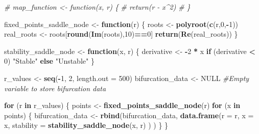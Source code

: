 \documentclass[
]{article}
\newenvironment{Shaded}{\begin{snugshade}}{\end{snugshade}}
\newcommand{\AttributeTok}[1]{\textcolor[rgb]{0.13,0.29,0.53}{#1}}
\newcommand{\CommentTok}[1]{\textcolor[rgb]{0.56,0.35,0.01}{\textit{#1}}}
\newcommand{\ConstantTok}[1]{\textcolor[rgb]{0.56,0.35,0.01}{#1}}
\newcommand{\ControlFlowTok}[1]{\textcolor[rgb]{0.13,0.29,0.53}{\textbf{#1}}}
\newcommand{\DecValTok}[1]{\textcolor[rgb]{0.00,0.00,0.81}{#1}}
\newcommand{\FunctionTok}[1]{\textcolor[rgb]{0.13,0.29,0.53}{\textbf{#1}}}
\newcommand{\NormalTok}[1]{#1}
\newcommand{\OtherTok}[1]{\textcolor[rgb]{0.56,0.35,0.01}{#1}}
\newcommand{\SpecialCharTok}[1]{\textcolor[rgb]{0.81,0.36,0.00}{\textbf{#1}}}
\newcommand{\StringTok}[1]{\textcolor[rgb]{0.31,0.60,0.02}{#1}}
\begin{document}
\begin{Shaded}
\begin{Highlighting}[]
\CommentTok{\# map\_function \textless{}{-} function(x, r) \{}
\CommentTok{\#   return(r {-} x\^{}2)}
\CommentTok{\# \}}

\NormalTok{fixed\_points\_saddle\_node }\OtherTok{\textless{}{-}} \ControlFlowTok{function}\NormalTok{(r) \{}
\NormalTok{  roots }\OtherTok{\textless{}{-}} \FunctionTok{polyroot}\NormalTok{(}\FunctionTok{c}\NormalTok{(r,}\DecValTok{0}\NormalTok{,}\SpecialCharTok{{-}}\DecValTok{1}\NormalTok{))}
\NormalTok{  real\_roots }\OtherTok{\textless{}{-}}\NormalTok{ roots[}\FunctionTok{round}\NormalTok{(}\FunctionTok{Im}\NormalTok{(roots),}\DecValTok{10}\NormalTok{)}\SpecialCharTok{==}\DecValTok{0}\NormalTok{]}
  \FunctionTok{return}\NormalTok{(}\FunctionTok{Re}\NormalTok{(real\_roots))}
\NormalTok{\}}

\NormalTok{stability\_saddle\_node }\OtherTok{\textless{}{-}} \ControlFlowTok{function}\NormalTok{(x, r) \{}
\NormalTok{  derivative }\OtherTok{\textless{}{-}} \SpecialCharTok{{-}}\DecValTok{2} \SpecialCharTok{*}\NormalTok{ x}
  \ControlFlowTok{if}\NormalTok{ (derivative }\SpecialCharTok{\textless{}} \DecValTok{0}\NormalTok{) }\StringTok{"Stable"} \ControlFlowTok{else} \StringTok{"Unstable"}
\NormalTok{\}}

\NormalTok{r\_values }\OtherTok{\textless{}{-}} \FunctionTok{seq}\NormalTok{(}\SpecialCharTok{{-}}\DecValTok{1}\NormalTok{, }\DecValTok{2}\NormalTok{, }\AttributeTok{length.out =} \DecValTok{500}\NormalTok{)}
\NormalTok{bifurcation\_data }\OtherTok{\textless{}{-}} \ConstantTok{NULL} \CommentTok{\#Empty variable to store bifurcation data}

\ControlFlowTok{for}\NormalTok{ (r }\ControlFlowTok{in}\NormalTok{ r\_values) \{}
\NormalTok{  points }\OtherTok{\textless{}{-}} \FunctionTok{fixed\_points\_saddle\_node}\NormalTok{(r)}
  \ControlFlowTok{for}\NormalTok{ (x }\ControlFlowTok{in}\NormalTok{ points) \{}
\NormalTok{    bifurcation\_data }\OtherTok{\textless{}{-}} \FunctionTok{rbind}\NormalTok{(bifurcation\_data, }
                              \FunctionTok{data.frame}\NormalTok{(}\AttributeTok{r =}\NormalTok{ r, }
                                         \AttributeTok{x =}\NormalTok{ x, }
                                         \AttributeTok{stability =} \FunctionTok{stability\_saddle\_node}\NormalTok{(x, r)}
\NormalTok{                                         )}
\NormalTok{                              )}
\NormalTok{  \}}
\NormalTok{\}}


\end{Highlighting}
\end{Shaded}
\end{document}
